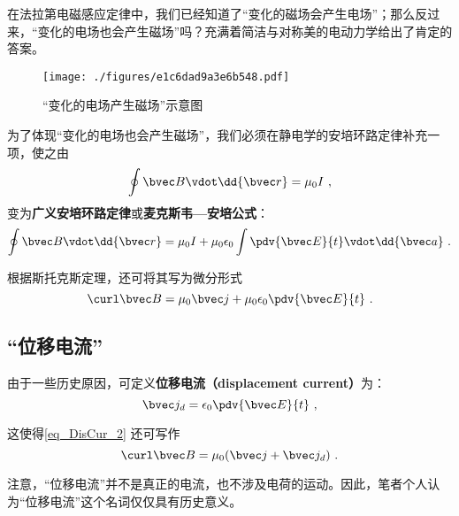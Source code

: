 
\begin{issues}
\issueDraft
\end{issues}


在法拉第电磁感应定律中，我们已经知道了“变化的磁场会产生电场”；那么反过来，“变化的电场也会产生磁场”吗？充满着简洁与对称美的电动力学给出了肯定的答案。

\begin{figure}[ht]
\centering
\texttt{[image: ./figures/e1c6dad9a3e6b548.pdf]}
\caption{“变化的电场产生磁场”示意图} \label{fig_DisCur_1}
\end{figure}

为了体现“变化的电场也会产生磁场”，我们必须在静电学的安培环路定律补充一项，使之由
\begin{equation}
\oint \bvec B \vdot \dd{\bvec r} = \mu_0 I~,
\end{equation}
变为\textbf{广义安培环路定律}或\textbf{麦克斯韦—安培公式}：
\begin{equation}
\oint \bvec B \vdot \dd{\bvec r} = \mu_0 I + \mu_0 \epsilon_0 \int \pdv{\bvec E}{t} \vdot \dd{\bvec a}~.
\end{equation}

根据斯托克斯定理，还可将其写为微分形式
\begin{equation}\label{eq_DisCur_2}
\curl \bvec B = \mu_0 \bvec j + \mu_0\epsilon_0 \pdv{\bvec E}{t}~.
\end{equation}

\subsection{“位移电流”}
由于一些历史原因，可定义\textbf{位移电流（displacement current）}为：
\begin{equation}
\bvec j_d = \epsilon_0 \pdv{\bvec E}{t}~,
\end{equation}

这使得\autoref{eq_DisCur_2} 还可写作
\begin{equation}
\curl \bvec B = \mu_0 (\bvec j + \bvec j_d)~.
\end{equation}

注意，“位移电流”并不是真正的电流，也不涉及电荷的运动。因此，笔者个人认为“位移电流”这个名词仅仅具有历史意义。

